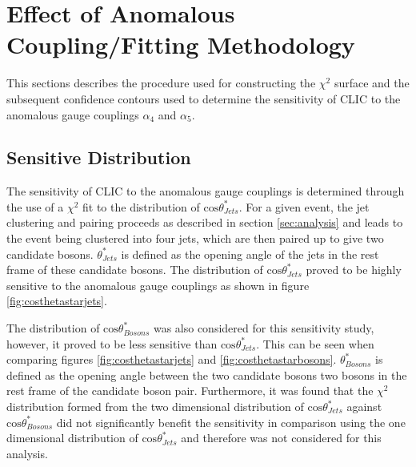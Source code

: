 
\section{Effect of Anomalous Coupling/Fitting Methodology}
This sections describes the procedure used for constructing the $\chi^{2}$ surface and the subsequent confidence contours used to determine the sensitivity of CLIC to the anomalous gauge couplings $\alpha_{4}$ and $\alpha_{5}$.

\subsection{Sensitive Distribution}
The sensitivity of CLIC to the anomalous gauge couplings is determined through the use of a $\chi^{2}$ fit to the distribution of $\text{cos}\theta^{*}_{Jets}$.  For a given event, the jet clustering and pairing proceeds as described in section \ref{sec:analysis} and leads to the event being clustered into four jets, which are then paired up to give two candidate bosons.  $\theta^{*}_{Jets}$ is defined as the opening angle of the jets in the rest frame of these candidate bosons.  The distribution of $\text{cos}\theta^{*}_{Jets}$ proved to be highly sensitive to the anomalous gauge couplings as shown in figure \ref{fig:costhetastarjets}.

The distribution of $\text{cos}\theta^{*}_{Bosons}$ was also considered for this sensitivity study, however, it proved to be less sensitive than $\text{cos}\theta^{*}_{Jets}$.  This can be seen when comparing figures \ref{fig:costhetastarjets} and \ref{fig:costhetastarbosons}.  $\theta^{*}_{Bosons}$ is defined as the opening angle between the two candidate bosons two bosons in the rest frame of the candidate boson pair.  Furthermore, it was found that the $\chi^{2}$ distribution formed from the two dimensional distribution of $\text{cos}\theta^{*}_{Jets}$ against $\text{cos}\theta^{*}_{Bosons}$ did not significantly benefit the sensitivity in comparison using the one dimensional distribution of $\text{cos}\theta^{*}_{Jets}$ and therefore was not considered for this analysis.


